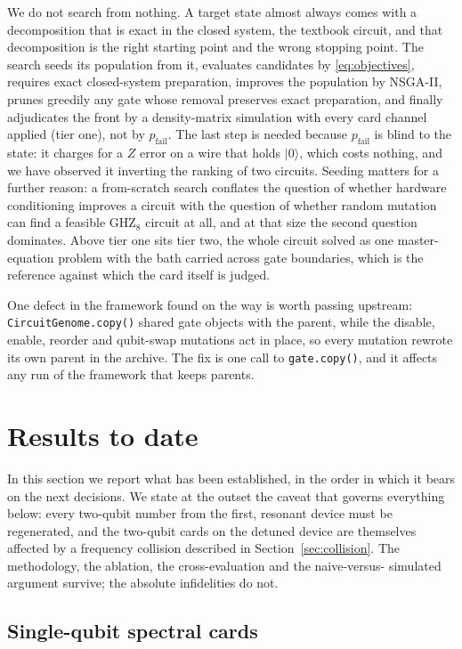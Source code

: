 \documentclass[10pt]{article}
\newcommand{\pfail}{p_{\mathrm{fail}}}
\begin{document}
We do not search from nothing. A target state almost always comes with a
decomposition that is exact in the closed system, the textbook circuit, and
that decomposition is the right starting point and the wrong stopping point.
The search seeds its population from it, evaluates candidates by
\eqref{eq:objectives}, requires exact closed-system preparation, improves the
population by NSGA-II, prunes greedily any gate whose removal preserves exact
preparation, and finally adjudicates the front by a density-matrix simulation
with every card channel applied (tier one), not by $\pfail$. The last step is
needed because $\pfail$ is blind to the state: it charges for a $Z$ error on a
wire that holds $|0\rangle$, which costs nothing, and we have observed it
inverting the ranking of two circuits. Seeding matters for a further reason: a
from-scratch search conflates the question of whether hardware conditioning
improves a circuit with the question of whether random mutation can find a
feasible GHZ$_8$ circuit at all, and at that size the second question dominates.
Above tier one sits tier two, the whole circuit solved as one master-equation
problem with the bath carried across gate boundaries, which is the reference
against which the card itself is judged.

One defect in the framework found on the way is worth passing upstream:
\texttt{CircuitGenome.copy()} shared gate objects with the parent, while the
disable, enable, reorder and qubit-swap mutations act in place, so every
mutation rewrote its own parent in the archive. The fix is one call to
\texttt{gate.copy()}, and it affects any run of the framework that keeps
parents.

\section{Results to date}
\label{sec:results}

In this section we report what has been established, in the order in which it
bears on the next decisions. We state at the outset the caveat that governs
everything below: every two-qubit number from the first, resonant device must
be regenerated, and the two-qubit cards on the detuned device are themselves
affected by a frequency collision described in Section~\ref{sec:collision}.
The methodology, the ablation, the cross-evaluation and the naive-versus-%
simulated argument survive; the absolute infidelities do not.

\subsection{Single-qubit spectral cards}
\end{document}
